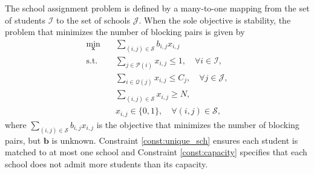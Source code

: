 \documentclass[11pt]{article}
\begin{document}

The school assignment problem is defined by a many-to-one mapping from the set of students $\mathcal{I}$ to the set of schools $\mathcal{J}$. When the sole objective is stability, the problem that minimizes the number of blocking pairs is given by 
\begin{align}
    \min_{\mathbf x} \quad &  \sum_{(i,j) \in \mathcal{S}} b_{i,j} x_{i,j} \\ 
    \text{s.t.} \quad & \sum_{j \in \mathcal{P}(i)} x_{i,j} \le 1, \quad \forall i \in \mathcal{I} ,\label{const:unique_sch}\\
    & \sum_{i \in \mathcal{Q}(j)} x_{i,j} \le C_j, \quad \forall j \in \mathcal{J}, \label{const:capacity} \\ 
    & \sum_{(i,j) \in \mathcal{S}} x_{i,j} \ge N, \label{const:min_matched} \\
    &x_{i,j} \in \{0,1\}, \quad \forall (i,j) \in \mathcal{S},
\end{align}
where $\sum_{(i,j) \in \mathcal{S}} b_{i,j} x_{i,j}$ is the objective that minimizes the number of blocking pairs, but $\mathbf{b}$ is unknown. Constraint \eqref{const:unique_sch} ensures each student is matched to at most one school and Constraint \eqref{const:capacity} specifies that each school does not admit more students than its capacity.
\end{document}
